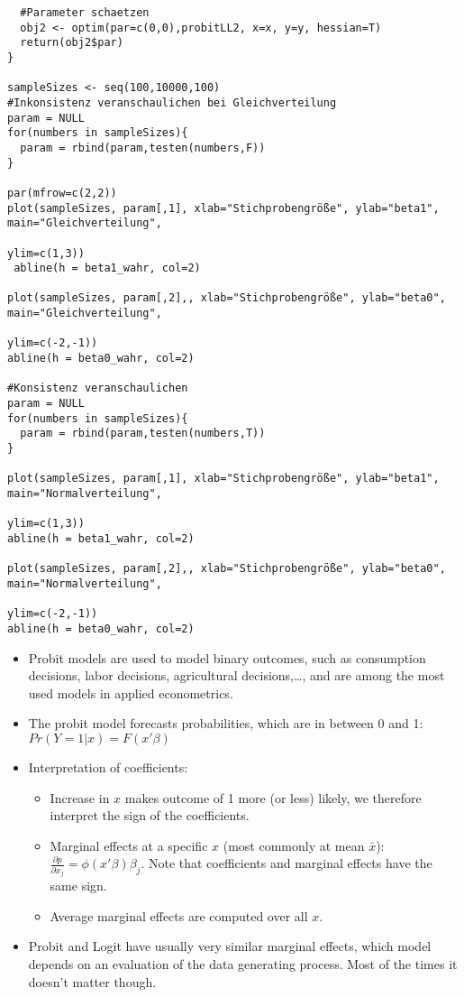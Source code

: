 \documentclass{article}
\begin{document}
\begin{solution}
\begin{verbatim}
  #Parameter schaetzen
  obj2 <- optim(par=c(0,0),probitLL2, x=x, y=y, hessian=T)
  return(obj2$par)
}

sampleSizes <- seq(100,10000,100)
#Inkonsistenz veranschaulichen bei Gleichverteilung
param = NULL
for(numbers in sampleSizes){
  param = rbind(param,testen(numbers,F))
}

par(mfrow=c(2,2))
plot(sampleSizes, param[,1], xlab="Stichprobengröße", ylab="beta1", main="Gleichverteilung",
                                                                                ylim=c(1,3))
 abline(h = beta1_wahr, col=2)

plot(sampleSizes, param[,2],, xlab="Stichprobengröße", ylab="beta0", main="Gleichverteilung",
                                                                                ylim=c(-2,-1))
abline(h = beta0_wahr, col=2)

#Konsistenz veranschaulichen
param = NULL
for(numbers in sampleSizes){
  param = rbind(param,testen(numbers,T))
}

plot(sampleSizes, param[,1], xlab="Stichprobengröße", ylab="beta1", main="Normalverteilung",
                                                                                ylim=c(1,3))
abline(h = beta1_wahr, col=2)

plot(sampleSizes, param[,2],, xlab="Stichprobengröße", ylab="beta0", main="Normalverteilung",
                                                                                ylim=c(-2,-1))
abline(h = beta0_wahr, col=2)
\end{verbatim}
\begin{itemize}
  \item Probit models are used to model binary outcomes, such as consumption decisions, labor decisions, agricultural decisions,\dots, and are among the most used models in applied econometrics.
  \item The probit model forecasts probabilities, which are in between 0 and 1: $Pr(Y=1|x)=F(x'\beta)$
  \item Interpretation of coefficients:
  \begin{itemize}
    \item Increase in $x$ makes outcome of 1 more (or less) likely, we therefore interpret the sign of the coefficients.
    \item Marginal effects at a specific $x$ (most commonly at mean $\bar{x}$): $\frac{\partial p}{\partial x_j} = \phi(x'\beta)\beta_j$. Note that coefficients and marginal effects have the same sign.
    \item Average marginal effects are computed over all $x$.
  \end{itemize}
  \item Probit and Logit have usually very similar marginal effects, which model depends on an evaluation of the data generating process. Most of the times it doesn't matter though.
\end{itemize}
\end{solution}
\end{document}
